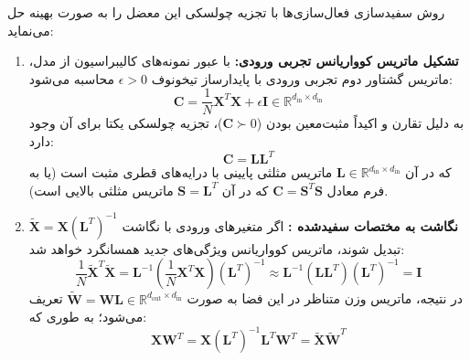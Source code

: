 \documentclass[12pt,a4paper]{report}
\theoremstyle{definition}
\begin{document}
روش سفیدسازی فعال‌سازی‌ها با تجزیه چولسکی  این معضل را به صورت بهینه حل می‌نماید:
\begin{enumerate}
    \item \textbf{تشکیل ماتریس کوواریانس تجربی ورودی:}
    با عبور نمونه‌های کالیبراسیون از مدل، ماتریس گشتاور دوم تجربی ورودی با پایدارساز تیخونوف $\epsilon > 0$ محاسبه می‌شود:
    \begin{equation}
    \mathbf{C} = \frac{1}{N} \mathbf{X}^T \mathbf{X} + \epsilon \mathbf{I} \in \mathbb{R}^{d_{\text{in}} \times d_{\text{in}}}
    \end{equation}
    به دلیل تقارن و اکیداً مثبت‌معین بودن ($\mathbf{C} \succ 0$)، تجزیه چولسکی یکتا برای آن وجود دارد:
    \begin{equation}
    \mathbf{C} = \mathbf{L} \mathbf{L}^T
    \end{equation}
    که در آن $\mathbf{L} \in \mathbb{R}^{d_{\text{in}} \times d_{\text{in}}}$ ماتریس مثلثی پایینی با درایه‌های قطری مثبت است (یا به فرم معادل $\mathbf{C} = \mathbf{S}^T \mathbf{S}$ که در آن $\mathbf{S} = \mathbf{L}^T$ ماتریس مثلثی بالایی است).

    \item \textbf{نگاشت به مختصات سفیدشده :}
    اگر متغیرهای ورودی با نگاشت $\widetilde{\mathbf{X}} = \mathbf{X} (\mathbf{L}^T)^{-1}$ تبدیل شوند، ماتریس کوواریانس ویژگی‌های جدید همسانگرد  خواهد شد:
    \begin{equation}
    \frac{1}{N} \widetilde{\mathbf{X}}^T \widetilde{\mathbf{X}} = \mathbf{L}^{-1} \left( \frac{1}{N} \mathbf{X}^T \mathbf{X} \right) (\mathbf{L}^T)^{-1} \approx \mathbf{L}^{-1} (\mathbf{L} \mathbf{L}^T) (\mathbf{L}^T)^{-1} = \mathbf{I}
    \end{equation}
    در نتیجه، ماتریس وزن متناظر در این فضا به صورت $\widetilde{\mathbf{W}} = \mathbf{W} \mathbf{L} \in \mathbb{R}^{d_{\text{out}} \times d_{\text{in}}}$ تعریف می‌شود؛ به طوری که:
    \begin{equation}
    \mathbf{X} \mathbf{W}^T = \mathbf{X} (\mathbf{L}^T)^{-1} \mathbf{L}^T \mathbf{W}^T = \widetilde{\mathbf{X}} \widetilde{\mathbf{W}}^T
    \end{equation}


\end{enumerate}
\end{document}
